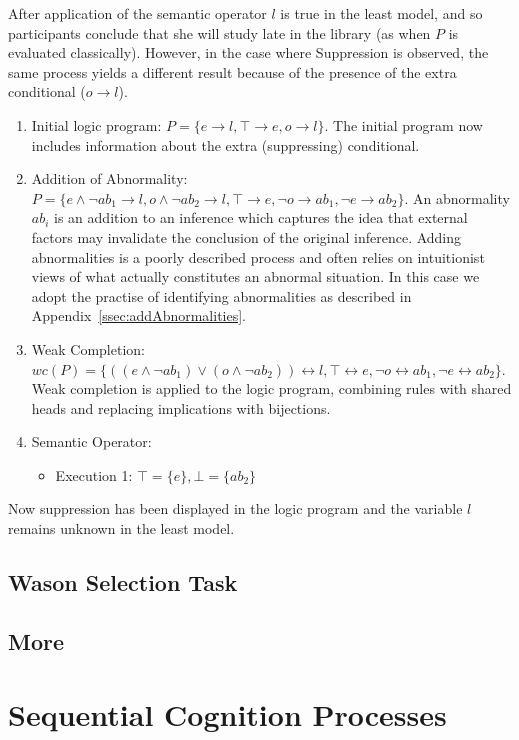 \documentclass[
11pt, %
english, %
singlespacing, %
headsepline, %
]{MastersDoctoralThesis} %
\begin{document}
After application of the semantic operator $l$ is true in the least model, and so participants conclude that she will study late in the library (as when $P$ is evaluated classically). However, in the case where Suppression is observed, the same process yields a different result because of the presence of the extra conditional ($o\rightarrow l$).
\begin{enumerate}
\item Initial logic program: $P = \{e \rightarrow l, \top \rightarrow e, o \rightarrow l \}$. The initial program now includes information about the extra (suppressing) conditional.
\item Addition of Abnormality: $P = \{e \land \lnot ab_1 \rightarrow l, o \land \lnot ab_2 \rightarrow l, \top \rightarrow e, \lnot o \rightarrow ab_1, \lnot e \rightarrow ab_2 \}$. An abnormality $ab_i$ is an addition to an inference which captures the idea that external factors may invalidate the conclusion of the original inference. Adding abnormalities is a poorly described process and often relies on intuitionist views of what actually constitutes an abnormal situation. In this case we adopt the practise of identifying abnormalities as described in Appendix~\ref{ssec:addAbnormalities}.
\item Weak Completion: $wc(P) = \{((e \land \lnot ab_1) \lor (o \land \lnot ab_2)) \leftrightarrow l, \top \leftrightarrow e, \lnot o \leftrightarrow ab_1, \lnot e \leftrightarrow ab_2 \}$. Weak completion is applied to the logic program, combining rules with shared heads and replacing implications with bijections.
\item Semantic Operator:
\begin{itemize}
\item Execution 1: $\top=\{e\}, \bot=\{ab_2\}$
\end{itemize}
\end{enumerate}

Now suppression has been displayed in the logic program and the variable $l$ remains unknown in the least model.

\section{Wason Selection Task}
\section{More}

\chapter{Sequential Cognition Processes}
\end{document}
